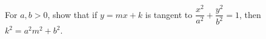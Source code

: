 For $a,b>0$, show that if $y=mx+k$ is tangent to $\dfrac{x^2}{a^2}+\dfrac{y^2}{b^2}=1$, then $k^2=a^2m^2+b^2$.
